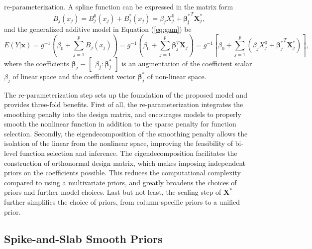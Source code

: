 \documentclass[AMA,STIX1COL,]{WileyNJD-v2}
\begin{document}
re-parameterization. A spline function can be expressed in the matrix
form \[
B_j(x_j) = B_j^0(x_j) + B_j^*(x_j) = \beta_j X^0_j + \boldsymbol{\beta_j^*}^T \boldsymbol{X}_j^*,
\] and the generalized additive model in Equation (\ref{eq:gam}) be
\begin{equation}\label{eq:gam-repa}
E(Y|\boldsymbol{x}) = g^{-1}(\beta_0 + \sum\limits^p_{j=1} B_j(x_j)) = g^{-1}(\beta_0 + \sum\limits^p_{j=1} \boldsymbol{\beta}_j^T \boldsymbol{X}_j) = g^{-1}\left[\beta_0 + \sum\limits^p_{j=1} (\beta_j X^0_j + {\boldsymbol{\beta}_j^*}^T \boldsymbol{X}_j^*)\right],
\end{equation} where the coefficients
\(\boldsymbol{\beta}_j \equiv \begin{bmatrix} \beta_j : \boldsymbol{\beta}^*_j \end{bmatrix}\)
is an augmentation of the coefficient scalar \(\beta_j\) of linear space
and the coefficient vector \(\boldsymbol{\beta}^*_j\) of non-linear
space.

The re-parameterization step sets up the foundation of the proposed
model and provides three-fold benefits. First of all, the
re-parameterization integrates the smoothing penalty into the design
matrix, and encourages models to properly smooth the nonlinear function
in addition to the sparse penalty for function selection. Secondly, the
eigendecomposition of the smoothing penalty allows the isolation of the
linear from the nonlinear space, improving the feasibility of bi-level
function selection and inference. The eigendecomposition facilitates the
construction of orthonormal design matrix, which makes imposing
independent priors on the coefficients possible. This reduces the
computational complexity compared to using a multivariate priors, and
greatly broadens the choices of priors and further model choices. Last
but not least, the scaling step of \(\boldsymbol{X}^*\) further
simplifies the choice of priors, from column-specific priors to a
unified prior.

\hypertarget{spike-and-slab-smooth-priors}{%
\subsection{Spike-and-Slab Smooth
Priors}\label{spike-and-slab-smooth-priors}}
\end{document}
